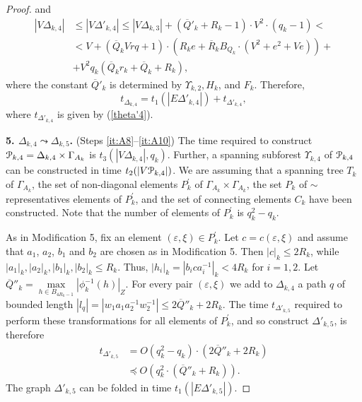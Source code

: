 \documentclass[a4paper,12pt]{article}
\newcommand{\G}{\Gamma }
\newcommand{\D}{\Delta }
\newcommand{\e}{\varepsilon }
\newcommand{\U}{\Upsilon }
\newcommand{\cP}{{\cal{P}}}
\numberwithin{equation}{section}
\numberwithin{figure}{section}
\begin{document}
\begin{proof}
and
\begin{equation}\label{vtheta4}
\begin{split}
|V\D_{k,4}| &\le |V \D'_{k,4}| \le |V \D_{k,3}| +(\overline{Q}'_k+R_k-1)\cdot
V^2 \cdot(q_k-1)<\\
&< V + (\overline{Q}_k V rq +1)\cdot(R_k e +\overline{R}_k B_{Q_k}
 \cdot(V^2 + e^2 + V e)) +\\
& + V^2 q_k (\overline{Q}_k r_k +\overline{Q}_k +R_k) ,
\end{split}
\end{equation}
where the constant $\overline{Q}'_k$ is determined by $\U_{k,2}, H_k$, and
$F_k$.
Therefore,
\begin{equation}\label{theta4}
t_{\D_{k,4}} = t_1(|E\D'_{k,4}|) + t_{\D'_{k,4}},
\end{equation}
where $t_{\D'_{k,4}}$ is given by (\ref{theta'4}).

{\bf 5. $\D_{k,4} \leadsto \D_{k,5}$.} (Steps \ref{it:A8}--\ref{it:A10}) The time required to construct
$\cP_{k,4}=\D_{k,4}\times \G_{A_k}$ is $t_3(|V \D_{k,4}|, q_k)$. Further,
 a spanning subforest $\U_{k,4}$ of $\cP_{k,4}$ can be constructed in time
$t_2(|V\cP_{k,4}|)$. We are assuming that  a spanning tree $T_k$ of
$\G_{A_k}$, the set of non-diagonal elements $P_k^\prime$ of
$\G_{A_k}\times \G_{A_k}$, the set $P_k$ of $\sim$ representatives
elements of $P_k^\prime$, and the set of connecting elements
 $C_k$ have been constructed. Note that the number of elements of $P_k^\prime$ is
$q_k^2-q_k$.



As in Modification 5, fix an element $(\e,\xi)\in P_k^\prime$.
Let $c=c(\e,\xi)$ and assume that $a_1$, $a_2$, $b_1$
and $b_2$  are chosen as in Modification 5. Then $|c|_k\le 2R_k$,
while $|a_1|_k, |a_2|_k, |b_1|_k,|b_2|_k \le R_k$.
Thus, $|h_i|_k = |b_ica_i^{-1}|_k < 4R_k$ for
$i=1,2$. Let $\overline{Q}''_k=\max\limits_{h \in
B_{4R_k-1}}|\phi^{-1}_k(h)|_Z$. For every pair $(\e,\xi) $ we add
to $\D_{k,4}$ a path $q$ of bounded length $|l_q|= |w_1 a_1a_2^{-1}
w_2^{-1}| \le 2 \overline{Q}''_k +2 R_k$.
The time $t_{\D'_{k,5}}$ required to perform
these transformations for all elements of $P_k^\prime$, and
so construct $\D'_{k,5}$, is therefore
\begin{equation}\label{theta'5}
\begin{split}
t_{\D'_{k,5}} &= O(q_k^2-q_k)\cdot(2\overline{Q}''_k+2R_k)\\
&\preceq O(q_k^2 \cdot (\overline{Q}''_k+R_k)).
\end{split}
\end{equation}
The graph $\D'_{k,5}$ can be folded in time $t_1(|E\D'_{k,5}|)$.


\end{proof}
\end{document}
